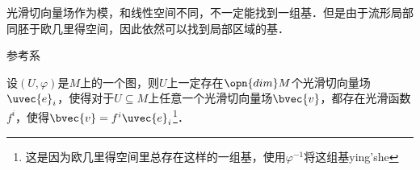 光滑切向量场作为模，和线性空间不同，不一定能找到一组基．但是由于流形局部同胚于欧几里得空间，因此依然可以找到局部区域的基．


\begin{definition}{参考系}

设$(U, \varphi)$是$M$上的一个图，则$U$上一定存在$\opn{dim}M$个光滑切向量场$\uvec{e}_i$，使得对于$U\subseteq M$上任意一个光滑切向量场$\bvec{v}$，都存在光滑函数$f^i$，使得$\bvec{v}=f^i\uvec{e}_i$\footnote{这是因为欧几里得空间里总存在这样的一组基，使用$\varphi^{-1}$将这组基ying'she}．

\end{definition}











